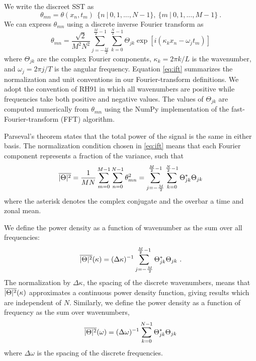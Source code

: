 \documentclass[10pt]{article}
\newcommand{\ol}{\ensuremath{\overline}}
\begin{document}
We write the discreet SST as
\begin{equation}
\theta_{mn} = \theta( x_n, t_m ) \ \ \{n\ |\ 0,1, ..., N-1\} ,\ \{m\ |\ 0,1, ..., M-1\} \ .
\end{equation}
We can express $\theta_{mn}$ using a discrete inverse Fourier transform as
\begin{equation}
\theta_{mn} = \frac{\sqrt{2}}{M^2 N^2} \sum_{j=-\frac{M}{2}}^{\frac{M}{2}-1} \sum_{k=0}^{\frac{N}{2}-1} \Theta_{jk} \exp[ i (\kappa_k x_n - \omega_j t_m ) ] 
\label{eq:ift}
\end{equation}
where $\Theta_{jk}$ are the complex Fourier components, $\kappa_k = 2 \pi k / L$ is the wavenumber, and $\omega_j = 2 \pi j / T$ is the   angular frequency. %
Equation \eqref{eq:ift} summarizes the normalization and unit conventions in our Fourier-transform definitions.
We adopt the convention of RH91 in which all wavenumbers are positive while frequencies take both positive and negative values. The values of $\Theta_{jk}$ are computed numerically from $\theta_{mn}$ using the NumPy implementation of the fast-Fourier-transform (FFT) algorithm. 

Parseval's theorem states that the total power of the signal is the same in either basis. The normalization condition chosen in \eqref{eq:ift} means that each Fourier component represents a fraction of the variance, such that 
\begin{equation}
\ol{|\Theta|^2} = \frac{1}{MN} \sum_{m=0}^{M-1} \sum_{n=0}^{N-1} \theta_{mn}^2 = \sum_{j=-\frac{M}{2}}^{\frac{M}{2}-1} \sum_{k=0}^{\frac{N}{2}-1} \Theta_{jk}^\ast  \Theta_{jk} 
\end{equation}
where the asterisk denotes the complex conjugate and the overbar a time and zonal mean.

We define the power density as a function of wavenumber as the sum over all frequencies:
\begin{equation}
\ol{|\Theta|^2}(\kappa) = (\Delta \kappa)^{-1} \sum_{j=-\frac{M}{2}}^{\frac{M}{2}-1} \Theta_{jk}^\ast  \Theta_{jk} \ .
\label{eq:Theta_kappa}
\end{equation}
The normalization by $\Delta \kappa$, the spacing of the discrete wavenumbers, means that $\ol{|\Theta|^2}(\kappa)$ approximates a continuous power density function, giving results which are independent of $N$.  
Similarly, we define the power density as a function of frequency as the sum over wavenumbers,
\begin{equation}
\ol{|\Theta|^2}(\omega) = (\Delta \omega)^{-1} \sum_{k=0}^{N-1} \Theta_{jk}^\ast   \Theta_{jk} 
\end{equation}
where $\Delta \omega$ is the spacing of the discrete frequencies.
\end{document}
